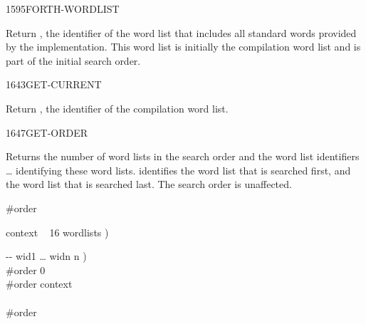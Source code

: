 \vspace*{-1ex}
\begin{worddef}{1595}{FORTH-WORDLIST}
\item {}

	Return , the identifier of the word list that includes
	all standard words provided by the implementation. This word list
	is initially the compilation word list and is part of the initial
	search order.

	\begin{testing} %
	\end{testing}
\end{worddef}


\begin{worddef}{1643}{GET-CURRENT}
\item {}

	Return , the identifier of the compilation word list.
\end{worddef}


\begin{worddef}{1647}{GET-ORDER}
\item {}

	Returns the number of word lists  in the search order
	and the word list identifiers  {\ldots} 
	identifying these word lists.  identifies the word
	list that is searched first, and  the word list that
	is searched last. The search order is unaffected.

	\begin{implement} %

		 \#order

		 context  ~ 16  wordlists )  

		\word{:}   -{}- wid1 {\ldots} widn n ) \\
		\tab \#order  0  \\
		\tab[2] \#order   \word{-}   context \word{+}  \\
		\tab {} \\
		\tab \#order  \\
		\word{;}
	\end{implement}
\end{worddef}


